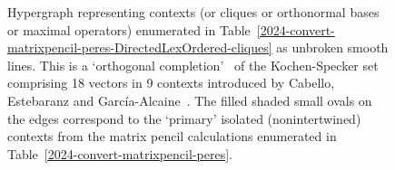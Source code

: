 \documentclass[
  twocolumn,
 showpacs,
 showkeys,
 preprintnumbers,
 amsmath,amssymb,
 aps,
 prl,
  longbibliography,
 floatfix,
 ]{revtex4-2}
\begin{document}
\begin{figure}
\begin{center}
{
}
\end{center}
\caption{\label{2024-convert-f-24-24}
Hypergraph representing contexts (or cliques or orthonormal bases or maximal operators) enumerated in Table~\ref{2024-convert-matrixpencil-peres-DirectedLexOrdered-cliques}
as unbroken smooth lines. This is a `orthogonal completion'~\cite{peres-91,pavicic-2004ksafq} of the
Kochen-Specker set comprising 18 vectors in 9 contexts introduced by Cabello, Estebaranz and Garc{\'{i}}a-Alcaine~\cite{cabello-96}.
The filled shaded small ovals on the edges correspond to the `primary' isolated (nonintertwined) contexts from the matrix pencil calculations enumerated
in Table~\ref{2024-convert-matrixpencil-peres}.
}
\end{figure}



\end{document}
